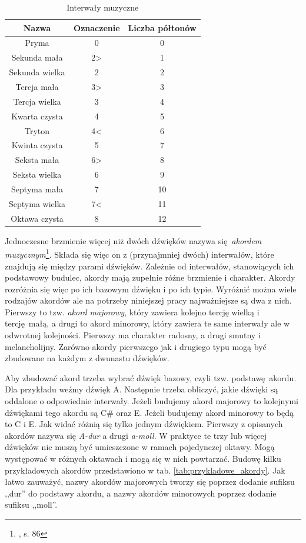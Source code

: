 \begin{table}[htb]
    \centering
    \caption{Interwały muzyczne}
    \label{tab:interwaly}
    \begin{tabular}{|c|c|c|} \hline
        Nazwa & Oznaczenie & Liczba półtonów \\ \hline
        Pryma           & 0     & 0  \\
        Sekunda mała    & 2>    & 1  \\
        Sekunda wielka  & 2     & 2  \\
        Tercja mała     & 3>    & 3  \\
        Tercja wielka   & 3     & 4  \\
        Kwarta czysta   & 4     & 5  \\
        Tryton          & 4<    & 6  \\
        Kwinta czysta   & 5     & 7  \\
        Seksta mała     & 6>    & 8  \\
        Seksta wielka   & 6     & 9  \\
        Septyma mała    & 7     & 10 \\
        Septyma wielka  & 7<    & 11 \\
        Oktawa czysta   & 8     & 12 \\ \hline
    \end{tabular}
\end{table}

Jednoczesne brzmienie więcej niż dwóch dźwięków nazywa się \emph{akordem muzycznym}\footnote{\cite{lerch_introduction_2012}, s. 86}. Składa się więc on z (przynajmniej dwóch) interwałów, które znajdują się między parami dźwięków. Zależnie od interwałów, stanowiących ich podstawowy budulec, akordy mają zupełnie różne brzmienie i charakter. Akordy rozróżnia się więc po ich bazowym dźwięku i po ich typie. Wyróżnić można wiele rodzajów akordów ale na potrzeby niniejszej pracy najważniejsze są dwa z nich.  Pierwszy to tzw. \emph{akord majorowy}, który zawiera kolejno tercję wielką i tercję małą, a drugi to akord minorowy, który zawiera te same interwały ale w odwrotnej kolejności. Pierwszy ma charakter radosny, a drugi smutny i melancholijny. Zarówno akordy pierwszego jak i drugiego typu mogą być zbudowane na każdym z dwunastu dźwięków. 

Aby zbudować akord trzeba wybrać dźwięk bazowy, czyli tzw. podstawę akordu. Dla przykładu weźmy dźwięk A. Następnie trzeba obliczyć, jakie dźwięki są oddalone o odpowiednie interwały. Jeżeli budujemy akord majorowy to kolejnymi dźwiękami tego akordu są C\# oraz E. Jeżeli budujemy akord minorowy to będą to C i E. Jak widać różnią się tylko jednym dźwiękiem. Pierwszy z opisanych akordów nazywa się \emph{A-dur} a drugi \emph{a-moll}. W praktyce te trzy lub więcej dźwięków nie muszą być umieszczone w ramach pojedynczej oktawy. Mogą występować w różnych oktawach i mogą się w nich powtarzać. Budowę kilku przykładowych akordów przedstawiono w tab. \ref{tab:przykladowe_akordy}. Jak łatwo zauważyć, nazwy akordów majorowych tworzy się poprzez dodanie sufiksu ,,dur'' do podstawy akordu, a nazwy akordów minorowych poprzez dodanie sufiksu ,,moll''.

